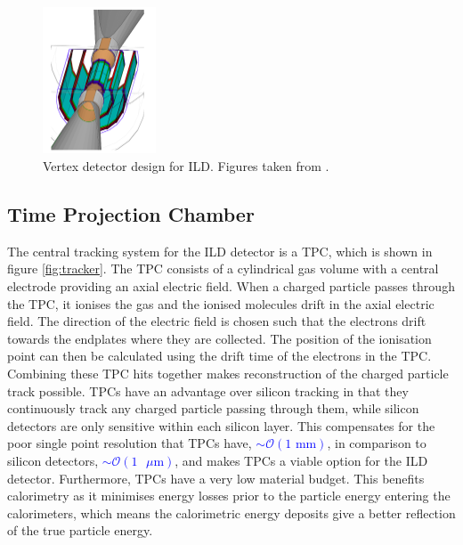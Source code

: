 \begin{figure}[h!]
\centering
\includegraphics[width=0.3\textwidth]{LCDetectorsAndPFlow/Plots/Pictures/Vertex3.png}
\caption[Vertex detector design for ILD.  Figures taken from \cite{arXiv:1006.3396}.]{Vertex detector design for ILD.  Figures taken from \cite{arXiv:1006.3396}.}
\label{fig:vertexpicture}
\end{figure} 


\subsection{Time Projection Chamber}
The central tracking system for the ILD detector is a TPC, which is shown in figure \ref{fig:tracker}.  The TPC consists of a cylindrical gas volume with a central electrode providing an axial electric field.  When a charged particle passes through the TPC, it ionises the gas and the ionised molecules drift in the axial electric field.  The direction of the electric field is chosen such that the electrons drift towards the endplates where they are collected.  The position of the ionisation point can then be calculated using the drift time of the electrons in the TPC.  Combining these TPC hits together makes reconstruction of the charged particle track possible.  TPCs have an advantage over silicon tracking in that they continuously track any charged particle passing through them, while silicon detectors are only sensitive within each silicon layer.  This compensates for the poor single point resolution that TPCs have, \textcolor{blue}{$\sim \mathcal{O}(1 \text{ mm})$}, in comparison to silicon detectors, \textcolor{blue}{$\sim \mathcal{O}(1 \text{ }\mu\text{m})$}, and makes TPCs a viable option for the ILD detector.  Furthermore, TPCs have a very low material budget.  This benefits calorimetry as it minimises energy losses prior to the particle energy entering the calorimeters, which means the calorimetric energy deposits give a better reflection of the true particle energy.  

